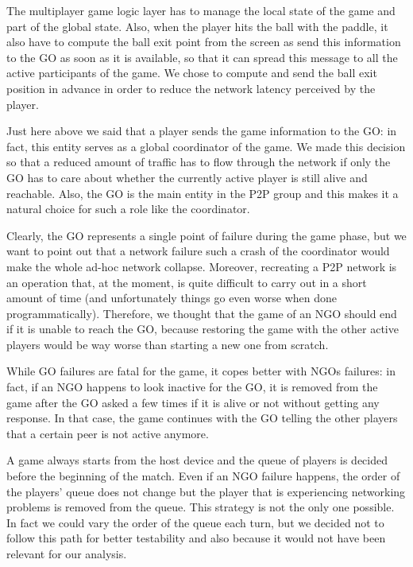 The multiplayer game logic layer has to manage the local state of the game and
part of the global state. Also, when the player hits the ball with the paddle,
it also have to compute the ball exit point from the screen as send this
information to the GO as soon as it is available, so that it can spread this
message to all the active participants of the game. We chose to compute and
send the ball exit position in advance in order to reduce the network latency
perceived by the player.

Just here above we said that a player sends the game information to the GO:
in fact, this entity serves as a global coordinator of the game. We made this
decision so that a reduced amount of traffic has to flow through the network
if only the GO has to care about whether the currently active player is still
alive and reachable. Also, the GO is the main entity in the P2P group and this
makes it a natural choice for such a role like the coordinator.

Clearly, the GO represents a single point of failure during the game phase, but
we want to point out that a network failure such a crash of the coordinator
would make the whole ad-hoc network collapse. Moreover, recreating a P2P
network is an operation that, at the moment, is quite difficult to carry out
in a short amount of time (and unfortunately things go even worse when done
programmatically). Therefore, we thought that the game of an NGO should end if
it is unable to reach the GO, because restoring the game with the other active
players would be way worse than starting a new one from scratch.

While GO failures are fatal for the game, it copes better with NGOs failures:
in fact, if an NGO happens to look inactive for the GO, it is removed from the
game after the GO asked a few times if it is alive or not without getting any
response. In that case, the game continues with the GO telling the other
players that a certain peer is not active anymore.

A game always starts from the host device and the queue of players is decided
before the beginning of the match. Even if an NGO failure happens, the order of
the players' queue does not change but the player that is experiencing
networking problems is removed from the queue.
This strategy is not the only one possible.
In fact we could vary the order of the queue each turn, but we decided
not to follow this path for better testability and also because it would not
have been relevant for our analysis.
